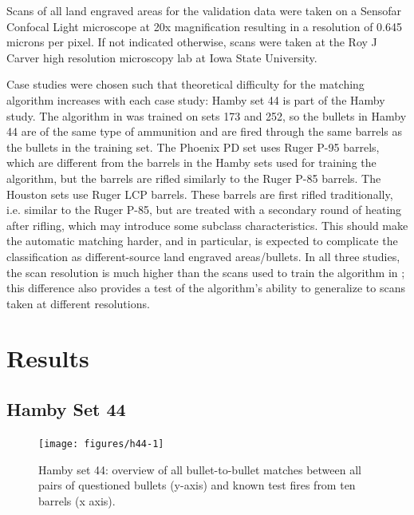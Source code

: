 \documentclass[doubleblind]{elsarticle}\usepackage[]{graphicx}\usepackage[]{color}
\newenvironment{knitrout}{}{} %
\begin{document}
Scans of all land engraved areas for the validation data were taken on a Sensofar Confocal Light microscope at 20x magnification resulting in a resolution of 0.645 microns per pixel. If not indicated otherwise, scans were taken at the Roy J Carver high resolution microscopy lab at Iowa State University.
 
Case studies were chosen such that theoretical difficulty for the matching algorithm increases with each case study: Hamby set 44 is part of the Hamby study. The algorithm in \citet{aoas2} was trained on sets 173 and 252, so the bullets in Hamby 44 are of the same type of ammunition and are fired through the same barrels as the bullets in the training set. The Phoenix PD set uses Ruger P-95 barrels, which are different from the barrels in the Hamby sets used for training the algorithm, but the barrels are rifled similarly to the Ruger P-85 barrels. The Houston sets use Ruger LCP barrels. These barrels are first rifled traditionally, i.e. similar to the Ruger P-85, but are treated with a secondary round of heating after rifling, which may introduce some subclass characteristics. This should make the automatic matching harder, and in particular, is expected to complicate the classification as different-source land engraved areas/bullets. In all three studies, the scan resolution is much higher than the scans used to train the algorithm in \citet{aoas2}; this difference also provides a test of the algorithm's ability to generalize to scans taken at different resolutions.

\section{Results}

\subsection{Hamby Set 44}

\begin{knitrout}
\color{fgcolor}\begin{figure}

{\centering \texttt{[image: figures/h44-1]} 

}

\caption[Hamby set 44]{Hamby set 44: overview of all bullet-to-bullet matches between all pairs of questioned bullets (y-axis) and known test fires from ten barrels (x axis).}\label{fig:h44}
\end{figure}


\end{knitrout}
\end{document}
